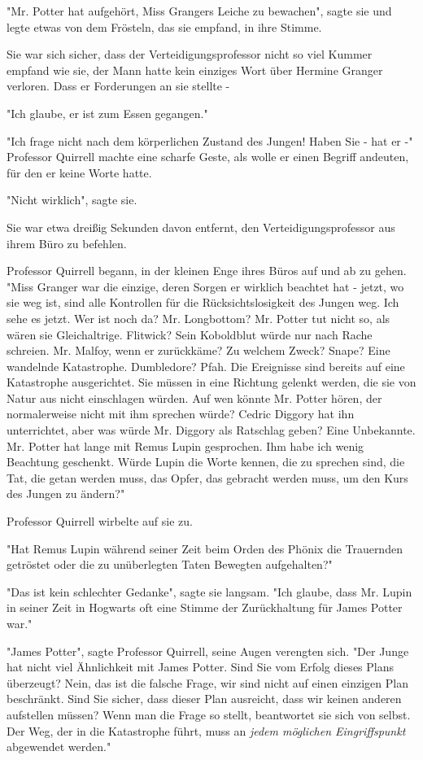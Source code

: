 {"Mr. Potter hat aufgehört, Miss Grangers Leiche zu bewachen", sagte sie und legte etwas von dem Frösteln, das sie empfand, in ihre Stimme.

Sie war sich sicher, dass der Verteidigungsprofessor nicht so viel Kummer empfand wie sie, der Mann hatte kein einziges Wort über Hermine Granger verloren. Dass er Forderungen an sie stellte -

"Ich glaube, er ist zum Essen gegangen."

"Ich frage nicht nach dem körperlichen Zustand des Jungen! Haben Sie - hat er -" Professor Quirrell machte eine scharfe Geste, als wolle er einen Begriff andeuten, für den er keine Worte hatte.

"Nicht wirklich", sagte sie.

Sie war etwa dreißig Sekunden davon entfernt, den Verteidigungsprofessor aus ihrem Büro zu befehlen.

Professor Quirrell begann, in der kleinen Enge ihres Büros auf und ab zu gehen. "Miss Granger war die einzige, deren Sorgen er wirklich beachtet hat - jetzt, wo sie weg ist, sind alle Kontrollen für die Rücksichtslosigkeit des Jungen weg. Ich sehe es jetzt. Wer ist noch da? Mr. Longbottom? Mr. Potter tut nicht so, als wären sie Gleichaltrige. Flitwick? Sein Koboldblut würde nur nach Rache schreien. Mr. Malfoy, wenn er zurückkäme? Zu welchem Zweck? Snape? Eine wandelnde Katastrophe. Dumbledore? Pfah. Die Ereignisse sind bereits auf eine Katastrophe ausgerichtet. Sie müssen in eine Richtung gelenkt werden, die sie von Natur aus nicht einschlagen würden. Auf wen könnte Mr. Potter hören, der normalerweise nicht mit ihm sprechen würde? Cedric Diggory hat ihn unterrichtet, aber was würde Mr. Diggory als Ratschlag geben? Eine Unbekannte. Mr. Potter hat lange mit Remus Lupin gesprochen. Ihm habe ich wenig Beachtung geschenkt. Würde Lupin die Worte kennen, die zu sprechen sind, die Tat, die getan werden muss, das Opfer, das gebracht werden muss, um den Kurs des Jungen zu ändern?"

Professor Quirrell wirbelte auf sie zu.

"Hat Remus Lupin während seiner Zeit beim Orden des Phönix die Trauernden getröstet oder die zu unüberlegten Taten Bewegten aufgehalten?"

"Das ist kein schlechter Gedanke", sagte sie langsam. "Ich glaube, dass Mr. Lupin in seiner Zeit in Hogwarts oft eine Stimme der Zurückhaltung für James Potter war."

"James Potter", sagte Professor Quirrell, seine Augen verengten sich. "Der Junge hat nicht viel Ähnlichkeit mit James Potter. Sind Sie vom Erfolg dieses Plans überzeugt? Nein, das ist die falsche Frage, wir sind nicht auf einen einzigen Plan beschränkt. Sind Sie sicher, dass dieser Plan ausreicht, dass wir keinen anderen aufstellen müssen? Wenn man die Frage so stellt, beantwortet sie sich von selbst. Der Weg, der in die Katastrophe führt, muss an \emph{jedem möglichen Eingriffspunkt} abgewendet werden."

}
